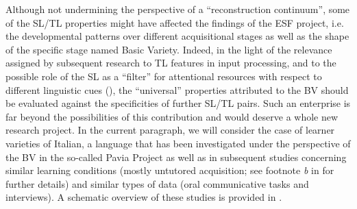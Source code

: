 \documentclass[output=paper]{langscibook}
\begin{document}
Although not undermining the perspective of a “reconstruction continuum”, some of the SL/TL properties might have affected the findings of the ESF project, i.e. the developmental patterns over different acquisitional stages as well as the shape of the specific stage named Basic Variety. Indeed, in the light of the relevance assigned by subsequent research to TL features in input processing, and to the possible role of the SL as a “filter” for attentional resources with respect to different linguistic cues (\citealt{VanPatten2015, EllisCollins2009}), the “universal” properties attributed to the BV should be evaluated against the specificities of further SL/TL pairs. Such an enterprise is far beyond the possibilities of this contribution and would deserve a whole new research project. In the current paragraph, we will consider the case of learner varieties of Italian, a language that has been investigated under the perspective of the BV in the so-called Pavia Project \citep{GiacaloneRamat2003} as well as in subsequent studies concerning similar learning conditions (mostly untutored acquisition; see footnote \textit{b} in  for further details) and similar types of data (oral communicative tasks and interviews). A schematic overview of these studies is provided in .
\end{document}
